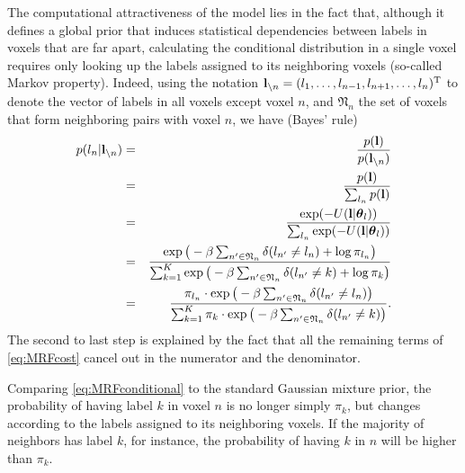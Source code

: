 \documentclass[10pt,twoside]{book}
\begin{document}
The computational attractiveness of the model lies in the fact that, although it defines a global prior that induces statistical dependencies between labels in voxels that are far apart, calculating the conditional distribution in a single voxel requires only looking up the labels assigned to its neighboring voxels (so-called Markov property). Indeed, using the notation $\mathbf{l}_{\setminus n} = ( l_1, \ldots, l_{n-1}, l_{n+1}, \ldots, l_n )^\mathrm{T}$ to denote the vector of labels in all voxels except voxel $n$, and $\mathfrak{N}_n$ the set of voxels that form neighboring pairs with voxel $n$, we have (Bayes' rule)
\begin{eqnarray}
  p( l_n | \fat{l}_{\setminus n} ) & = & \frac{ p( \fat{l} ) }{ p( \fat{l}_{\setminus n} ) } \nonumber\\
                                   & = & \frac{ p( \fat{l} ) }{ \sum_{l_n} p( \fat{l} ) } \nonumber\\
                                   & = & \frac{ \exp( -U(\fat{l} | \bldgr{\theta}_l) ) }{ \sum_{l_n} \exp( -U(\fat{l} | \bldgr{\theta}_l) ) }  \nonumber\\
                                   & = & \frac{ \exp\big( -\beta \sum_{{n'} \in \mathfrak{N}_n} \delta( l_{n'} \neq l_n ) +\log\pi_{l_n} \big) }%
                                              { \sum_{k=1}^K \exp\big( -\beta \sum_{n' \in \mathfrak{N}_n} \delta( l_{n'} \neq k ) +\log\pi_k \big)} \nonumber\\
                                   & = & \frac{ \pi_{l_n} \cdot \exp\big( -\beta \sum_{n' \in \mathfrak{N}_n} \delta( l_{n'} \neq l_n ) \big) }%
                                              { \sum_{k=1}^K \pi_k \cdot \exp\big( -\beta \sum_{n' \in \mathfrak{N}_n} \delta( l_{n'} \neq k ) \big)}.
  \label{eq:MRFconditional}                                
\end{eqnarray}
The second to last step is explained by the fact that all the remaining terms of \eqref{eq:MRFcost} cancel out in the numerator and the denominator.

Comparing \eqref{eq:MRFconditional} to the standard Gaussian mixture prior, the probability of having label $k$ in voxel $n$ is no longer simply $\pi_k$, but changes according to 
the labels assigned to its neighboring voxels.
% 
% 
% 
If the majority of neighbors has label $k$, for instance, the probability of having $k$ in $n$ will be higher than $\pi_k$.
\end{document}
